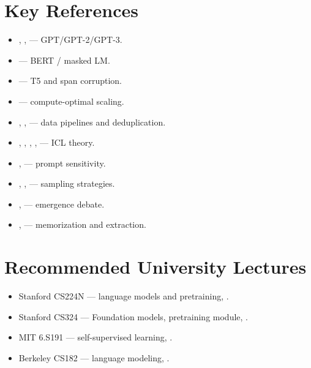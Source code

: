 \section{Key References}

\begin{itemize}
  \item \citet{radford2018improving}, \citet{radford2019language},
        \citet{brown2020language} --- GPT/GPT-2/GPT-3.
  \item \citet{devlin2019bert} --- BERT / masked LM.
  \item \citet{raffel2020t5} --- T5 and span corruption.
  \item \citet{hoffmann2022chinchilla} --- compute-optimal scaling.
  \item \citet{gao2020pile}, \citet{redpajama2023},
        \citet{lee2022deduplicating} --- data pipelines and
        deduplication.
  \item \citet{xie2022explanation}, \citet{olsson2022induction},
        \citet{garg2022transformers}, \citet{vonoswald2023transformers},
        \citet{dong2023survey} --- ICL theory.
  \item \citet{lu2022fantastically}, \citet{min2022rethinking} ---
        prompt sensitivity.
  \item \citet{holtzman2020curious}, \citet{fan2018hierarchical},
        \citet{nguyen2024minp} --- sampling strategies.
  \item \citet{wei2022emergent}, \citet{schaeffer2023mirage} ---
        emergence debate.
  \item \citet{carlini2021extracting}, \citet{carlini2023quantifying}
        --- memorization and extraction.
\end{itemize}

\section{Recommended University Lectures}

\begin{itemize}
  \item Stanford CS224N --- language models and pretraining,
        \citet{stanford_cs224n}.
  \item Stanford CS324 --- Foundation models, pretraining module,
        \citet{stanford_cs324}.
  \item MIT 6.S191 --- self-supervised learning, \citet{mit_6s191}.
  \item Berkeley CS182 --- language modeling, \citet{berkeley_cs182}.
\end{itemize}

